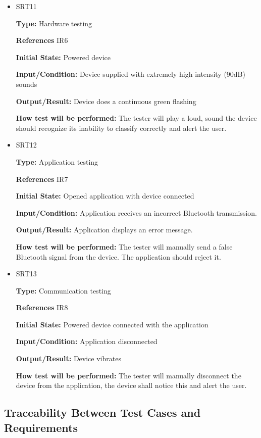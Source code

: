 \documentclass[12pt, titlepage]{article}
\begin{document}
\begin{itemize}
\item{SRT11} 

\textbf{Type:} Hardware testing

\textbf{References} IR6 
					
\textbf{Initial State:} Powered device  
					
\textbf{Input/Condition:} Device supplied with extremely high intensity (90dB) sounds
					
\textbf{Output/Result:} Device does a continuous green flashing
					
\textbf{How test will be performed:} The tester will play a loud, sound the device should recognize its inability to classify correctly and alert the user.

\item{SRT12} 

\textbf{Type:} Application testing

\textbf{References} IR7 
					
\textbf{Initial State:} Opened application with device connected    
					
\textbf{Input/Condition:} Application receives an incorrect Bluetooth transmission.
					
\textbf{Output/Result:} Application displays an error message. 
					
\textbf{How test will be performed:} The tester will manually send a false Bluetooth signal from the device. The application should reject it. 

\item{SRT13} 

\textbf{Type:} Communication testing

\textbf{References} IR8 
					
\textbf{Initial State:} Powered device connected with the application    
					
\textbf{Input/Condition:} Application disconnected
					
\textbf{Output/Result:} Device vibrates  
					
\textbf{How test will be performed:} The tester will manually disconnect the device from the application, the device shall notice this and alert the user. 

\end{itemize}


\subsection{Traceability Between Test Cases and Requirements}
\end{document}
